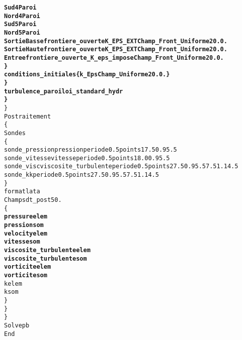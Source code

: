 \begin{alltt}
                     {\bf{Sud4 Paroi  }}
                     {\bf{Nord4 Paroi  }}
                     {\bf{Sud5 Paroi  }}
                     {\bf{Nord5 Paroi  }}
                     {\bf{SortieBasse frontiere_ouverte K_EPS_EXT Champ_Front_Uniforme 2 0. 0.  }}
                     {\bf{SortieHaute frontiere_ouverte K_EPS_EXT Champ_Front_Uniforme 2 0. 0.  }}
                     {\bf{Entree frontiere_ouverte_K_eps_impose Champ_Front_Uniforme 2 0. 0.  }}
                {\bf{\} }}
                {\bf{conditions_initiales \{     k_Eps Champ_Uniforme 2 0. 0. \}  }}
            {\bf{\} }}
            {\bf{turbulence_paroi loi_standard_hydr  }}
        {\bf{\} }}
    \}
    Postraitement 
    \{
        Sondes 
        \{
            sonde_pression pression periode 0.5 points 1 7.5 0.9 5.5
            sonde_vitesse vitesse periode 0.5 points 1 8.0 0.9 5.5
            sonde_visc viscosite_turbulente periode 0.5 points 2 7.5 0.9 5.5 7.5 1.1 4.5
            sonde_k k periode 0.5 points 2 7.5 0.9 5.5 7.5 1.1 4.5
        \}
                format lata
        Champs dt_post 50.
        \{
            {\bf{pressure elem}}
            {\bf{pression som}}
            {\bf{velocity elem}}
            {\bf{vitesse som}}
            {\bf{viscosite_turbulente elem}}
            {\bf{viscosite_turbulente som}}
            {\bf{vorticite elem}}
            {\bf{vorticite som}}
            k elem
            k som
        \}
    \}
\}
Solve pb
End
\end{alltt}
